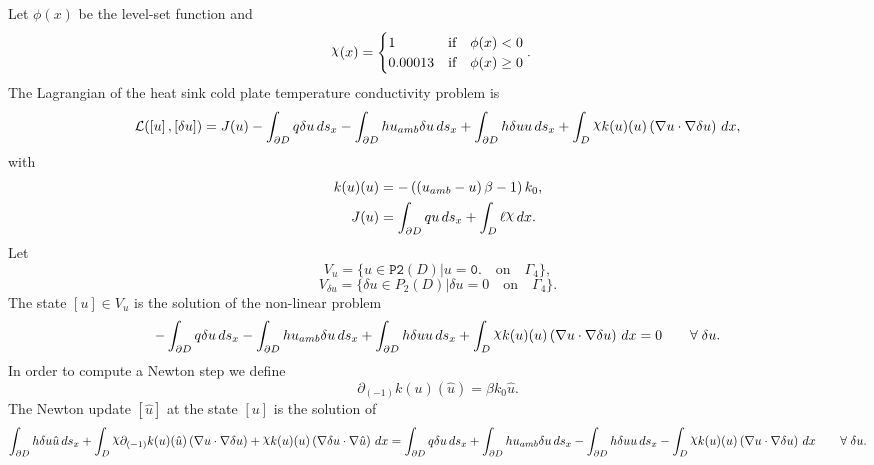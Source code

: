 \documentclass[preview]{standalone}
\let\oldcdot\cdot
\let\cdot\oldcdot
\begin{document}
Let $\phi(x)$ be the level-set function and
 \begin{align*}\raisebox{\depth}{$\chi$}(x) &= \begin{cases} 1 & \mbox{if}\quad \phi(x) < 0 \\ 0.00013 & \mbox{if}\quad \phi(x)  \ge 0 \end{cases}.\end{align*}
The Lagrangian of the heat sink cold plate temperature conductivity problem is
\begin{dmath*}
\mathcal L(\left[ u\right],\left[ \delta u\right]) = J(u) -  \int_{\partial D} q \delta u \,ds_x -  \int_{\partial D} h u_{amb} \delta u \,ds_x +  \int_{\partial D} h \delta u u \,ds_x +  \int_{D} \raisebox{\depth}{$\chi$} k(u)(u) \left(  \nabla u  \cdot  \nabla \delta u  \right) \,dx , 
\end{dmath*}
with 
\begin{align*}
k(u)(u) &= - \left(\left(u_{amb} - u\right) \beta - 1\right) k_{0},\\
J(u) &=  \int_{\partial D} q u \,ds_x +  \int_{D} \ell \raisebox{\depth}{$\chi$} \,dx.
 \end{align*}
Let
\begin{equation*}
V_{u} = \{ u \in \mathtt{\text{P2}}(D)| u = \mathtt{\text{0.}}  \quad \text{{on}} \quad\Gamma_{4} \},\end{equation*}
\begin{equation*}
V_{\delta u} = \{ \delta u \in P_{2}(D)| \delta u = 0  \quad \text{{on}} \quad\Gamma_{4} \}.\end{equation*}
The state $\left[ u\right] \in  V_{u}$ is the solution of the non-linear problem
\begin{dmath*}
-  \int_{\partial D} q \delta u \,ds_x -  \int_{\partial D} h u_{amb} \delta u \,ds_x +  \int_{\partial D} h \delta u u \,ds_x +  \int_{D} \raisebox{\depth}{$\chi$} k(u)(u) \left(  \nabla u  \cdot  \nabla \delta u  \right) \,dx = 0\qquad \forall\; \delta u . 
\end{dmath*}
In order to compute a Newton step we define
\begin{dmath*}
\partial_{(-1)} k(u)(\hat u) = \beta k_{0} \hat u.
 \end{dmath*}
The Newton update $\left[ \hat u\right]$ at the state $\left[ u\right]$ is the solution of
\begin{dmath*}
 \int_{\partial D} h \delta u \hat u \,ds_x +  \int_{D} \raisebox{\depth}{$\chi$} \partial_{(-1)} k(u)(\hat u) \left(  \nabla u  \cdot  \nabla \delta u  \right) + \raisebox{\depth}{$\chi$} k(u)(u) \left(  \nabla \delta u  \cdot  \nabla \hat u  \right) \,dx =  \int_{\partial D} q \delta u \,ds_x +  \int_{\partial D} h u_{amb} \delta u \,ds_x -  \int_{\partial D} h \delta u u \,ds_x -  \int_{D} \raisebox{\depth}{$\chi$} k(u)(u) \left(  \nabla u  \cdot  \nabla \delta u  \right) \,dx\qquad \forall\; \delta u . 
\end{dmath*}
\end{document}
